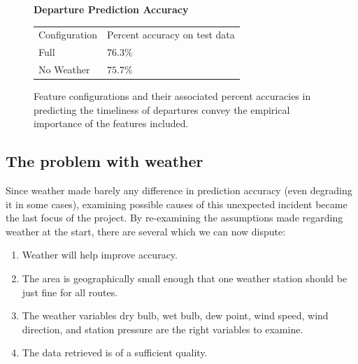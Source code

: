 \documentclass[11pt]{article} %
\begin{document}
\begin{figure}
    \centering
    \textbf{Departure Prediction Accuracy}

    \begin{tabular}{ll}
        Configuration & Percent accuracy on test data\\
        Full        & $76.3\%$\\
        No Weather  & $75.7\%$\\
    \end{tabular}
    \caption{Feature configurations and their associated percent accuracies in
         predicting the timeliness of departures convey the empirical importance of 
         the features included.}
    \label{fig:second_run_data_departures}
\end{figure}

% 
% 

\subsection{The problem with weather}
\label{sec:weather_prob}
Since weather made barely any difference in prediction accuracy (even 
degrading it in some cases), examining possible causes of this unexpected 
incident became the last focus of the project. By re-examining the assumptions
made regarding weather at the start, there are several which we can now dispute:

\begin{enumerate}
    \item Weather will help improve accuracy.
    \item \label{wAssumption_oneStation} The area is geographically small enough 
        that one weather station should be just fine for all routes.
    \item The weather variables dry bulb, wet bulb, dew point, wind speed, 
        wind direction, and station pressure are the right variables to examine.
    \item The data retrieved is of a sufficient quality.
\end{enumerate}
\end{document}
